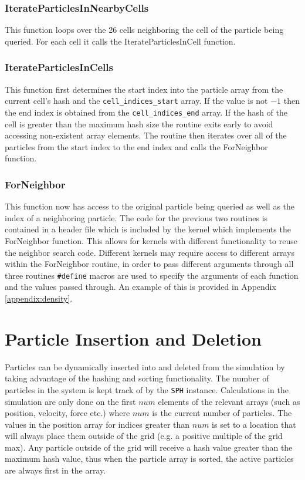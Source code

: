 \subsubsection{IterateParticlesInNearbyCells}
This function loops over the 26 cells neighboring the cell of the particle
being queried. For each cell it calls the IterateParticlesInCell function.

\subsubsection{IterateParticlesInCells}
This function first determines the start index into the particle array from the
current cell's hash and the \verb|cell_indices_start| array. If the value is
not $-1$ then the end index is obtained from the \verb|cell_indices_end| array.
If the hash of the cell is greater than the maximum hash size the routine exits
early to avoid accessing non-existent array elements. The routine then iterates
over all of the particles from the start index to the end index and calls the
ForNeighbor function.

\subsubsection{ForNeighbor}
This function now has access to the original particle being queried as well as
the index of a neighboring particle. The code for the previous two routines is
contained in a header file which is included by the kernel which implements the
ForNeighbor function. This allows for kernels with different functionality to
reuse the neighbor search code. Different kernels may require access to
different arrays within the ForNeighbor routine, in order to pass different
arguments through all three routines \verb|#define| macros are used to specify
the arguments of each function and the values passed through. An example of
this is provided in Appendix \ref{appendix:density}.

\section{Particle Insertion and Deletion}
Particles can be dynamically inserted into and deleted from the simulation by
taking advantage of the hashing and sorting functionality. The number of
particles in the system is kept track of by the \verb|SPH| instance.
Calculations in the simulation are only done on the first $num$ elements of the
relevant arrays (such as position, velocity, force etc.) where $num$ is the
current number of particles. The values in the position array for indices
greater than $num$ is set to a location that will always place them outside of
the grid (e.g. a positive multiple of the grid max). Any particle outside of
the grid will receive a hash value greater than the maximum hash value, thus
when the particle array is sorted, the active particles are always first in the
array. 

